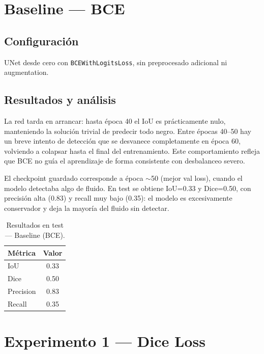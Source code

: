 \documentclass[12pt,a4paper]{article}
\begin{document}
\section{Baseline — BCE}

\subsection{Configuración}

UNet desde cero con \texttt{BCEWithLogitsLoss}, sin preprocesado adicional ni augmentation.

\subsection{Resultados y análisis}

La red tarda en arrancar: hasta época 40 el IoU es prácticamente nulo, manteniendo la solución trivial de predecir todo negro. Entre épocas 40--50 hay un breve intento de detección que se desvanece completamente en época 60, volviendo a colapsar hasta el final del entrenamiento. Este comportamiento refleja que BCE no guía el aprendizaje de forma consistente con desbalanceo severo.

El checkpoint guardado corresponde a época $\sim$50 (mejor val loss), cuando el modelo detectaba algo de fluido. En test se obtiene IoU=0.33 y Dice=0.50, con precisión alta (0.83) y recall muy bajo (0.35): el modelo es excesivamente conservador y deja la mayoría del fluido sin detectar.

\begin{table}[H]
\centering
\caption{Resultados en test — Baseline (BCE).}
\label{tab:baseline}
\begin{tabular}{lc}
\toprule
Métrica & Valor \\
\midrule
IoU       & 0.33 \\
Dice      & 0.50 \\
Precision & 0.83 \\
Recall    & 0.35 \\
\bottomrule
\end{tabular}
\end{table}

\section{Experimento 1 — Dice Loss}
\end{document}
